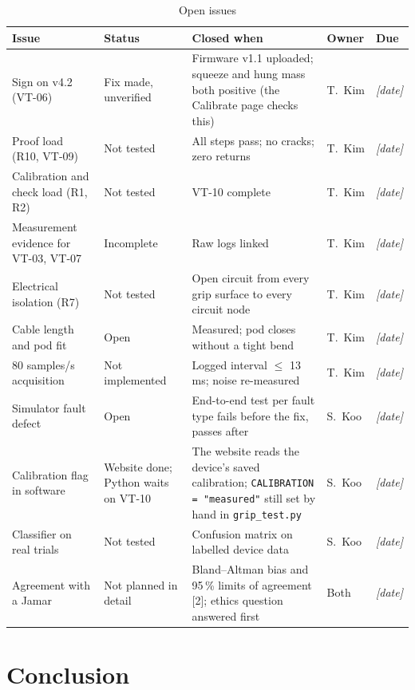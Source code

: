 \documentclass[10pt,a4paper]{article}
\newcommand{\nt}{\textcolor{warn}{Not tested}}
\begin{document}
\begin{table}[H]
\centering\small
\caption{Open issues}
\begin{tabularx}{\linewidth}{@{}P{3.5cm}p{1.9cm}LP{2.0cm}p{1.6cm}@{}}
\toprule
Issue & Status & Closed when & Owner & Due \\
\midrule
Sign on v4.2 (VT-06) & Fix made, unverified & Firmware v1.1 uploaded; squeeze and hung mass both positive (the Calibrate page checks this) & T.\ Kim & \textit{[date]} \\
Proof load (R10, VT-09) & \nt & All steps pass; no cracks; zero returns & T.\ Kim & \textit{[date]} \\
Calibration and check load (R1, R2) & \nt & VT-10 complete & T.\ Kim & \textit{[date]} \\
Measurement evidence for VT-03, VT-07 & Incomplete & Raw logs linked & T.\ Kim & \textit{[date]} \\
Electrical isolation (R7) & \nt & Open circuit from every grip surface to every circuit node & T.\ Kim & \textit{[date]} \\
Cable length and pod fit & Open & Measured; pod closes without a tight bend & T.\ Kim & \textit{[date]} \\
80 samples/s acquisition & Not implemented & Logged interval $\leq$ 13 ms; noise re-measured & T.\ Kim & \textit{[date]} \\
Simulator fault defect & Open & End-to-end test per fault type fails before the fix, passes after & S.\ Koo & \textit{[date]} \\
Calibration flag in software & Website done; Python waits on VT-10 & The website reads the device's saved calibration; \texttt{CALIBRATION = "measured"} still set by hand in \texttt{grip\_test.py} & S.\ Koo & \textit{[date]} \\
Classifier on real trials & \nt & Confusion matrix on labelled device data & S.\ Koo & \textit{[date]} \\
Agreement with a Jamar & Not planned in detail & Bland–Altman bias and 95\,\% limits of agreement [2]; ethics question answered first & Both & \textit{[date]} \\
\bottomrule
\end{tabularx}
\end{table}

\section{Conclusion}
\end{document}
